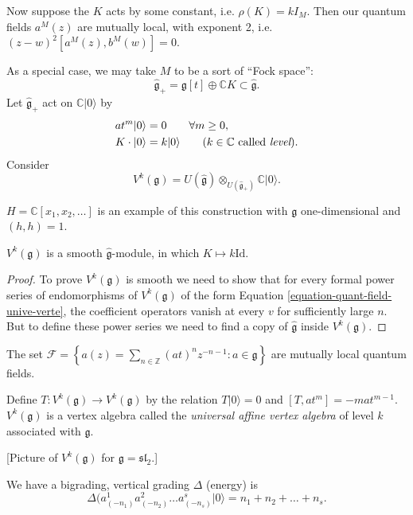 \noindent
Now suppose the $K$ acts by some constant,
i.e.
$\rho(K)=k I_M$.
Then our quantum fields $a^M(z)$ are
mutually local, with exponent 2, i.e.
$(z-w)^2[a^M(z),b^M(w)]=0$.

\medskip\noindent
As a special case, we may take
$M$ to be a sort of ``Fock space'':
$$
\hat{\mathfrak{g}}_+=\mathfrak{g}[t]\oplus
\mathbb{C}K\subset
\hat{\mathfrak{g}}.
$$
Let $\hat{\mathfrak{g}}_+$
act on $\mathbb{C} |0\rangle$ by
$$
\begin{aligned}
at^m |0\rangle&=0 \qquad \forall m \geq 0,\\
K\cdot |0\rangle&=k |0\rangle\qquad
(\text{$k \in \mathbb{C}$ called {\it
level}}).
\end{aligned}
$$
Consider
$$
V^k(\mathfrak{g})=U(\hat{\mathfrak{g}})
\otimes_{U(\hat{\mathfrak{g}}_+)}
\mathbb{C}|0\rangle.
$$

\begin{remark}
\label{remark-heise-speci-case-smoot-const}
$H=\mathbb{C}[x_1,x_2,\ldots]$ is an example
of this construction with
$\mathfrak{g}$ one-dimensional and $(h,h)=1$.
\end{remark}

\begin{exercise}
\label{exercise-Vk-is-smooth}
$V^k(\mathfrak{g})$ is a smooth
$\hat{\mathfrak{g}}$-module,
in which $K \mapsto  k \text{Id}$.
\end{exercise}

\begin{proof}
To prove  $V^k(\mathfrak{g})$ is smooth
we need to show that for every
formal power series of endomorphisms of
$V^k(\mathfrak{g})$ of the form Equation
\ref{equation-quant-field-unive-verte},
the coefficient operators vanish at every $v$
for sufficiently
large $n$. But to define these
power series we need to find a copy
of  $\hat{\mathfrak{g}}$ inside
$V^k(\mathfrak{g})$.
\end{proof}

The set $\mathcal{F}=\left\{a(z)=\sum_{n \in
\mathbb{Z}}
(at)^nz^{-n-1}:a \in \mathfrak{g}\right\}$
are mutually local quantum fields.

Define $T:V^k(\mathfrak{g}) \to
V^k(\mathfrak{g})$
by the relation $T |0\rangle=0$
and $[T,at^m]=-mat^{m-1}$.
$V^k(\mathfrak{g})$ is a vertex algebra
called the {\it universal affine vertex
algebra}
of level $k$ associated with $\mathfrak{g}$.

[Picture of $V^k(\mathfrak{g})$ for
$\mathfrak{g}=\mathfrak{sl}_2$.]

We have a bigrading, vertical grading
$\Delta$ (energy) is
$$
\Delta(a^1_{(-n_1)}a^2_{(-n_2)}\ldots
a^s_{(-n_s)}|0\rangle
=n_1+n_2+\ldots+n_s.
$$


